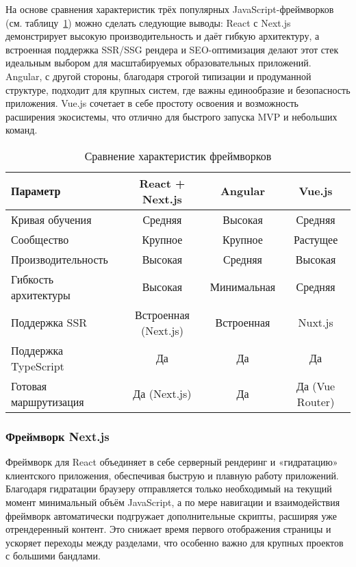 На основе сравнения характеристик трёх популярных JavaScript-фреймворков (см. таблицу~\ref{tab:framework-comparison}) можно сделать следующие выводы: React с Next.js демонстрирует высокую производительность и даёт гибкую архитектуру, а встроенная поддержка SSR/SSG рендера и SEO-оптимизация делают этот стек идеальным выбором для масштабируемых образовательных приложений. Angular, с другой стороны, благодаря строгой типизации и продуманной структуре, подходит для крупных систем, где важны единообразие и безопасность приложения. Vue.js сочетает в себе простоту освоения и возможность расширения экосистемы, что отлично для быстрого запуска MVP и небольших команд.

\begin{table}[h]
  \small
  \centering
  \caption{Сравнение характеристик фреймворков}
  \label{tab:framework-comparison}
  \begin{tabular}{|l|c|c|c|}
    \hline
    \textbf{Параметр}         & React + Next.js       & Angular       & Vue.js   \\ \hline
    Кривая обучения           & Средняя               & Высокая       & Средняя  \\ \hline
    Сообщество                & Крупное               & Крупное       & Растущее \\ \hline
    Производительность        & Высокая               & Средняя       & Высокая  \\ \hline
    Гибкость архитектуры      & Высокая               & Минимальная   & Средняя  \\ \hline
    Поддержка SSR             & Встроенная (Next.js)  & Встроенная    & Nuxt.js  \\ \hline
    Поддержка TypeScript      & Да                    & Да            & Да       \\ \hline
    Готовая маршрутизация     & Да (Next.js)          & Да            & Да (Vue Router) \\ \hline
  \end{tabular}
\end{table}

\subsubsection*{Фреймворк Next.js}

Фреймворк для React объединяет в себе серверный рендеринг и «гидратацию» клиентского приложения, обеспечивая быструю и плавную работу приложений. Благодаря гидратации браузеру отправляется только необходимый на текущий момент минимальный объём JavaScript, а по мере навигации и взаимодействия фреймворк автоматически подгружает дополнительные скрипты, расширяя уже отрендеренный контент. Это снижает время первого отображения страницы и ускоряет переходы между разделами, что особенно важно для крупных проектов с большими бандлами.


